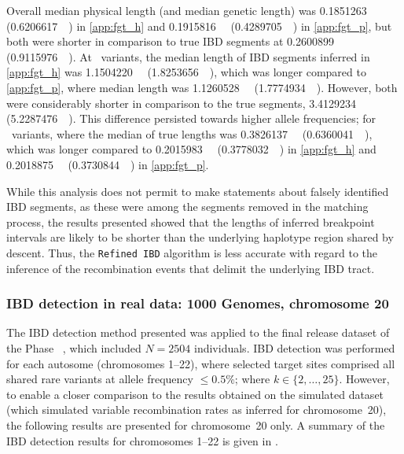 Overall median physical length (and median genetic length) was
\SI{0.1851263}{\mega\basepair} (\SI{0.6206617}{\centi\morgan}) in \ref{app:fgt_h} and
\SI{0.1915816}{\mega\basepair} (\SI{0.4289705}{\centi\morgan}) in \ref{app:fgt_p}, but both were shorter in comparison to true IBD segments at \SI{0.2600899}{\mega\basepair} (\SI{0.9115976}{\centi\morgan}).
At ~variants, the median length of IBD segments inferred in \ref{app:fgt_h} was \SI{1.1504220}{\mega\basepair} (\SI{1.8253656}{\centi\morgan}), which was longer compared to \ref{app:fgt_p}, where median length was \SI{1.1260528}{\mega\basepair} (\SI{1.7774934}{\centi\morgan}).
However, both were considerably shorter in comparison to the true segments, \SI{3.4129234}{\mega\basepair} (\SI{5.2287476}{\centi\morgan}).
This difference persisted towards higher allele frequencies; \eg for ~variants, where the median of true lengths was
\SI{0.3826137}{\mega\basepair} (\SI{0.6360041}{\centi\morgan}), which was
longer compared to \SI{0.2015983}{\mega\basepair} (\SI{0.3778032}{\centi\morgan}) in \ref{app:fgt_h} and \SI{0.2018875}{\mega\basepair} (\SI{0.3730844}{\centi\morgan}) in \ref{app:fgt_p}.


While this analysis does not permit to make statements about falsely identified IBD segments, as these were among the segments removed in the matching process, the results presented showed that the lengths of inferred breakpoint intervals are likely to be shorter than the underlying haplotype region shared by descent.
Thus, the \texttt{Refined\,IBD} algorithm is less accurate with regard to the inference of the recombination events that delimit the underlying IBD tract.



%
\subsubsection{IBD detection in real data: 1000 Genomes, chromosome 20}
%

The IBD detection method presented was applied to the final release dataset of the  Phase~ \citep{GenomesProjectConsortium:2012co,Auton:2015gk}, which included ${N=\num{2504}}$ individuals.
IBD detection was performed for each autosome (chromosomes 1--22), where selected target sites comprised all shared rare variants at allele frequency ${\leq 0.5\%}$; \ie \fk{} where ${k \in \{2, \ldots, 25\}}$.
However, to enable a closer comparison to the results obtained on the simulated dataset (which simulated variable recombination rates as inferred for chromosome~20), the following results are presented for chromosome~20 only.
A summary of the IBD detection results for chromosomes 1--22 is given in .


